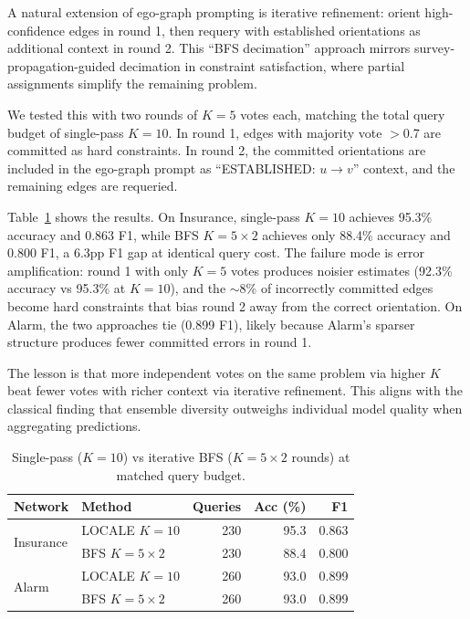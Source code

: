 \documentclass{article} %
\begin{document}
A natural extension of ego-graph prompting is iterative refinement: orient high-confidence edges in round 1, then requery with established orientations as additional context in round 2. This ``BFS decimation'' approach mirrors survey-propagation-guided decimation in constraint satisfaction, where partial assignments simplify the remaining problem.

We tested this with two rounds of $K{=}5$ votes each, matching the total query budget of single-pass $K{=}10$. In round 1, edges with majority vote $>$0.7 are committed as hard constraints. In round 2, the committed orientations are included in the ego-graph prompt as ``ESTABLISHED: $u \to v$'' context, and the remaining edges are requeried.

Table~\ref{tab:bfs} shows the results. On Insurance, single-pass $K{=}10$ achieves 95.3\% accuracy and 0.863 F1, while BFS $K{=}5 \times 2$ achieves only 88.4\% accuracy and 0.800 F1, a 6.3pp F1 gap at identical query cost. The failure mode is error amplification: round 1 with only $K{=}5$ votes produces noisier estimates (92.3\% accuracy vs 95.3\% at $K{=}10$), and the $\sim$8\% of incorrectly committed edges become hard constraints that bias round 2 away from the correct orientation. On Alarm, the two approaches tie (0.899 F1), likely because Alarm's sparser structure produces fewer committed errors in round 1.

The lesson is that more independent votes on the same problem via higher $K$ beat fewer votes with richer context via iterative refinement. This aligns with the classical finding that ensemble diversity outweighs individual model quality when aggregating predictions.

\begin{table}[h]
\centering
\caption{Single-pass ($K{=}10$) vs iterative BFS ($K{=}5 \times 2$ rounds) at matched query budget.}
\small
\begin{tabular}{llrrr}
\toprule
Network & Method & Queries & Acc (\%) & F1 \\
\midrule
\multirow{2}{*}{Insurance} & LOCALE $K{=}10$ & 230 & 95.3 & 0.863 \\
                           & BFS $K{=}5{\times}2$ & 230 & 88.4 & 0.800 \\
\midrule
\multirow{2}{*}{Alarm}     & LOCALE $K{=}10$ & 260 & 93.0 & 0.899 \\
                           & BFS $K{=}5{\times}2$ & 260 & 93.0 & 0.899 \\
\bottomrule
\end{tabular}
\label{tab:bfs}
\end{table}
\end{document}

